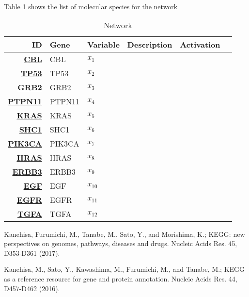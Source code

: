 Table 1 shows the list of molecular species for the network
\vspace{8pt}
\begin{table}[H]
	\begin{tabular}{rlllll}
		\hline
		ID & Gene & Variable & Description & Activation \\ 
		\hline
		\href{https://www.malacards.org/search/results/CBL}{\textbf{CBL}} & CBL & $x_1$ & & \\
		\href{https://www.malacards.org/search/results/TB53}{\textbf{TP53}} & TP53 & $x_2$ & & \\
		\href{https://www.malacards.org/search/results/GRB2}{\textbf{GRB2}} & GRB2 & $x_3$ & & \\
		\href{https://www.malacards.org/search/results/PTPN11}{\textbf{PTPN11}} & PTPN11 & $x_4$ & & \\ 
		\href{https://www.malacards.org/search/results/KRAS}{\textbf{KRAS}} & KRAS & $x_5$ & & \\
		\href{https://www.malacards.org/search/results/SHC1}{\textbf{SHC1}} & SHC1 & $x_6$ & & \\
		\href{https://www.malacards.org/search/results/PIK3CA}{\textbf{PIK3CA}} & PIK3CA & $x_7$ & & \\ 
		\href{https://www.malacards.org/search/results/HRAS}{\textbf{HRAS}} & HRAS & $x_8$ & & \\
		\href{https://www.malacards.org/search/results/ERBB3}{\textbf{ERBB3}} & ERBB3 & $x_9$ & & \\
		\href{https://www.malacards.org/search/results/EGF}{\textbf{EGF}} & EGF & $x_{10}$ & & \\
		\href{https://www.malacards.org/search/results/EGFR}{\textbf{EGFR}} & EGFR & $x_{11}$ & & \\
		\href{https://www.malacards.org/search/results/TGFA}{\textbf{TGFA}} & TGFA & $x_{12}$ & & \\
		\hline
	\end{tabular}
	\caption{Network}
	\label{tab:Table2}
\end{table}









 Kanehisa, Furumichi, M., Tanabe, M., Sato, Y., and Morishima, K.; 
\newblock KEGG: new perspectives on genomes, pathways, diseases and drugs. 
\newblock Nucleic Acids Res. 45, D353-D361 (2017).

 Kanehisa, M., Sato, Y., Kawashima, M., Furumichi, M., and Tanabe, M.; 
\newblock KEGG as a reference resource for gene and protein annotation. 
\newblock Nucleic Acids Res. 44, D457-D462 (2016).

